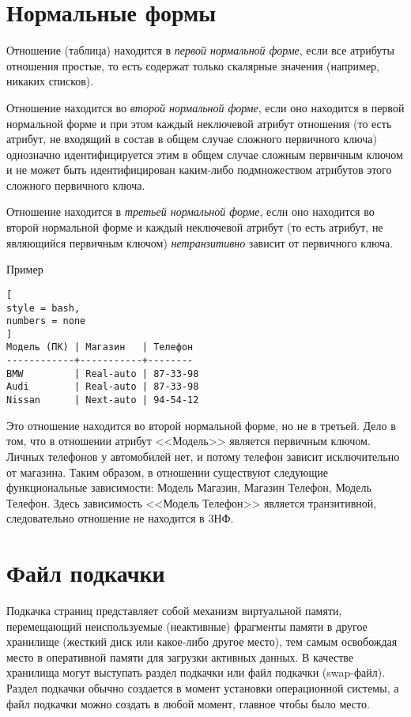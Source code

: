 \documentclass[%
	11pt,
	a4paper,
	utf8,
		]{article}
\begin{document}
\section{Нормальные формы}

Отношение (таблица) находится в \emph{первой нормальной форме}, если все атрибуты отношения простые, то есть содержат только скалярные значения (например, никаких списков).

Отношение находится во \emph{второй нормальной форме}, если оно находится в первой нормальной форме и при этом каждый неключевой атрибут отношения (то есть атрибут, не входящий в состав в общем случае сложного первичного ключа) однозначно идентифицируется этим в общем случае сложным первичным ключом и не может быть идентифицирован каким-либо подмножеством атрибутов этого сложного первичного ключа.

Отношение находится в \emph{третьей нормальной форме}, если оно находится во второй нормальной форме и каждый неключевой атрибут (то есть атрибут, не являющийся первичным ключом) \emph{нетранзитивно} зависит от первичного ключа.

Пример
\begin{lstlisting}[
style = bash,
numbers = none	
]
Модель (ПК) | Магазин   | Телефон
------------+-----------+--------
BMW         | Real-auto | 87-33-98
Audi        | Real-auto | 87-33-98
Nissan      | Next-auto | 94-54-12
\end{lstlisting}

Это отношение находится во второй нормальной форме, но не в третьей. Дело в том, что в отношении атрибут <<Модель>> является первичным ключом. Личных телефонов у автомобилей нет, и потому телефон зависит исключительно от магазина. Таким образом, в отношении существуют следующие функциональные зависимости: Модель \textrightarrow Магазин, Магазин \textrightarrow Телефон, Модель \textrightarrow Телефон. Здесь зависимость <<Модель \textrightarrow Телефон>> является транзитивной, следовательно отношение не находится в 3НФ.
 

\section{Файл подкачки}

Подкачка страниц представляет собой механизм виртуальной памяти, перемещающий неиспользуемые (неактивные) фрагменты памяти в другое хранилище (жесткий диск или какое-либо другое место), тем самым освобождая место в оперативной памяти для загрузки активных данных. В качестве хранилища могут выступать раздел подкачки или файл подкачки (swap-файл). Раздел подкачки обычно создается в момент установки операционной системы, а файл подкачки можно создать в любой момент, главное чтобы было место.
\end{document}
